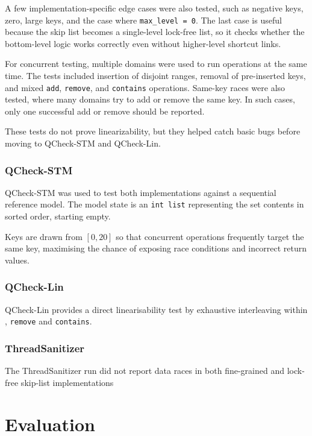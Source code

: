 \documentclass[11pt,a4paper]{article}
\begin{document}
A few implementation-specific edge cases were also tested, such as negative keys, zero, large keys, and the case where \texttt{max\_level = 0}. The last case is useful because the skip list becomes a single-level lock-free list, so it checks whether the bottom-level logic works correctly even without higher-level shortcut links.

For concurrent testing, multiple domains were used to run operations at the same time. The tests included insertion of disjoint ranges, removal of pre-inserted keys, and mixed \texttt{add}, \texttt{remove}, and \texttt{contains} operations. Same-key races were also tested, where many domains try to add or remove the same key. In such cases, only one successful add or remove should be reported.

These tests do not prove linearizability, but they helped catch basic bugs before moving to QCheck-STM and QCheck-Lin.

\subsubsection{QCheck-STM}
\label{sec:qcheck-stm}

QCheck-STM was used to test both implementations against a sequential reference
model. The model state is an \texttt{int list} representing the set contents in
sorted order, starting empty.  
  
Keys are drawn from $[0, 20]$ so that concurrent operations frequently target
the same key, maximising the chance of exposing race conditions and incorrect
return values.

 
 

\subsubsection{QCheck-Lin}
\label{sec:qcheck-lin}
 
QCheck-Lin provides a direct linearisability test by exhaustive interleaving
within , \texttt{remove} and \texttt{contains}.  


\subsubsection{ThreadSanitizer}
The ThreadSanitizer run did not report data races in both fine-grained and  lock-free skip-list implementations
\section{Evaluation}
\label{sec:evaluation}
\end{document}
